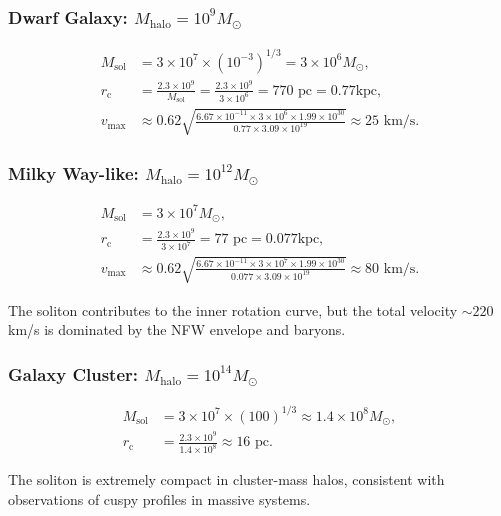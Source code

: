 \documentclass[11pt,a4paper]{article}
\newcommand{\ee}[1]{\times 10^{#1}}
\newcommand{\Msun}{\ensuremath{M_\odot}}
\newcommand{\Msol}{\ensuremath{M_{\mathrm{sol}}}}
\newcommand{\Mhalo}{\ensuremath{M_{\mathrm{halo}}}}
\newcommand{\kpc}{\ensuremath{\mathrm{kpc}}}
\newcommand{\rc}{\ensuremath{r_{\mathrm{c}}}}
\theoremstyle{definition}
\theoremstyle{remark}
\begin{document}
\subsubsection{Dwarf Galaxy: $\Mhalo = 10^9 \Msun$}

\begin{align}
\Msol &= 3 \times 10^7 \times (10^{-3})^{1/3} = 3 \times 10^6 \Msun, \\
\rc &= \frac{2.3 \times 10^9}{\Msol} = \frac{2.3 \times 10^9}{3 \times 10^6} = 770 \text{ pc} = 0.77 \kpc, \\
v_{\max} &\approx 0.62 \sqrt{\frac{6.67\ee{-11} \times 3\ee{6} \times 1.99\ee{30}}{0.77 \times 3.09\ee{19}}} \approx 25 \text{ km/s}.
\end{align}

\subsubsection{Milky Way-like: $\Mhalo = 10^{12} \Msun$}

\begin{align}
\Msol &= 3 \times 10^7 \Msun, \\
\rc &= \frac{2.3 \times 10^9}{3 \times 10^7} = 77 \text{ pc} = 0.077 \kpc, \\
v_{\max} &\approx 0.62 \sqrt{\frac{6.67\ee{-11} \times 3\ee{7} \times 1.99\ee{30}}{0.077 \times 3.09\ee{19}}} \approx 80 \text{ km/s}.
\end{align}

The soliton contributes to the inner rotation curve, but the total velocity $\sim 220$ km/s is dominated by the NFW envelope and baryons.

\subsubsection{Galaxy Cluster: $\Mhalo = 10^{14} \Msun$}

\begin{align}
\Msol &= 3 \times 10^7 \times (100)^{1/3} \approx 1.4 \times 10^8 \Msun, \\
\rc &= \frac{2.3 \times 10^9}{1.4 \times 10^8} \approx 16 \text{ pc}.
\end{align}

The soliton is extremely compact in cluster-mass halos, consistent with observations of cuspy profiles in massive systems.
\end{document}
